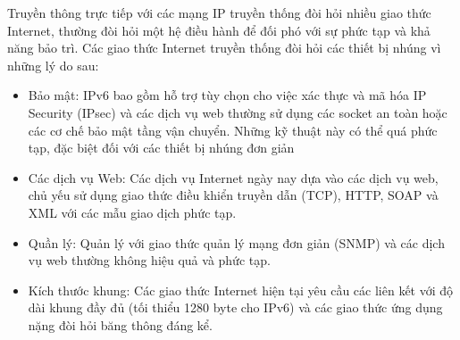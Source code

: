 \documentclass{report}
\begin{document}
	Truyền thông trực tiếp với các mạng IP truyền thống đòi hỏi nhiều giao thức Internet, thường
đòi hỏi một hệ điều hành để đối phó với sự phức tạp và khả năng bảo trì. Các giao thức Internet
truyền thống đòi hỏi các thiết bị nhúng vì những lý do sau: 
\begin{itemize}
	\item Bảo mật: IPv6 bao gồm hỗ trợ tùy chọn cho việc xác thực và mã hóa IP Security (IPsec) và
	các dịch vụ web thường sử dụng các socket an toàn hoặc các cơ chế bảo mật tầng vận chuyển.
	Những kỹ thuật này có thể quá phức tạp, đặc biệt đối với các thiết bị nhúng đơn giản
	\item Các dịch vụ Web: Các dịch vụ Internet ngày nay dựa vào các dịch vụ web, chủ yếu sử dụng
	giao thức điều khiển truyền dẫn (TCP), HTTP, SOAP và XML với các mẫu giao dịch phức
	tạp.
	\item Quần lý: Quản lý với giao thức quản lý mạng đơn giản (SNMP) và các dịch vụ web thường
	không hiệu quả và phức tạp.
	\item Kích thước khung: Các giao thức Internet hiện tại yêu cầu các liên kết với độ dài khung đầy
	đủ (tối thiểu 1280 byte cho IPv6) và các giao thức ứng dụng nặng đòi hỏi băng thông đáng kể.
\end{itemize}
\end{document}

